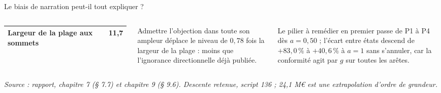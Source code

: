 \documentclass[aspectratio=169,10pt,t]{beamer}
\newcommand{\source}[1]{\par\vfill{\tiny\color{gris}\textit{Source : #1}}\par\vspace{-1mm}}
\begin{document}
\begin{frame}{Le biais de narration peut-il tout expliquer ?}
\begin{columns}[T,onlytextwidth]
\begin{tabular}{@{}lr@{}}
      Largeur de la plage aux sommets & 11,7 \\
      \bottomrule
    \end{tabular}\par\vspace{1.5mm}
    Admettre l'objection dans toute son ampleur déplace le niveau de $0{,}78$ fois la largeur de la plage : moins que l'ignorance directionnelle déjà publiée.\par\vspace{1mm}
    Le pilier à remédier en premier passe de P1 à P4 dès $a=0{,}50$ ; l'écart entre états descend de $+83{,}0\,\%$ à $+40{,}6\,\%$ à $a=1$ sans s'annuler, car la conformité agit par $g$ sur toutes les arêtes.
  \end{columns}
  \source{rapport, chapitre 7 (§ 7.7) et chapitre 9 (§ 9.6). Descente retenue, script 136 ; 24,1 M€ est une extrapolation d'ordre de grandeur.}
\end{frame}


\end{document}
